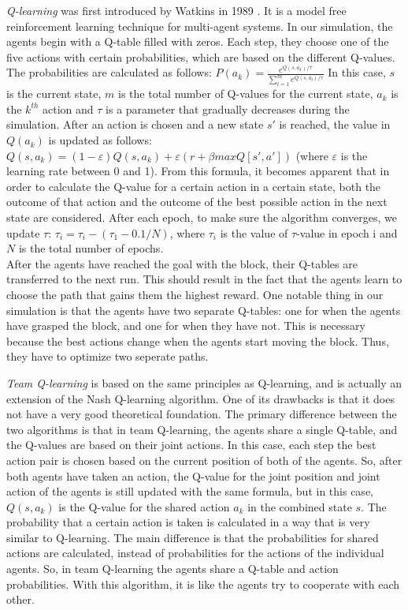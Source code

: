 \textit{Q-learning} was first introduced by Watkins in 1989 \cite{watkins1989}. It is a model free reinforcement learning technique for multi-agent systems. In our simulation, the agents begin with a Q-table filled with zeros. Each step, they choose one of the five actions with certain probabilities, which are based on the different Q-values. The probabilities are calculated as follows: $P(a_{k})=\frac{e^{Q(s,a_{k})/ \tau}}{\sum_{l=1}^{m}e^{Q(s,a_{l})/ \tau}}$ In this case, $s$ is the current state, $m$ is the total number of Q-values for the current state, $a_{k}$ is the $k^{th}$ action and $\tau$ is a parameter that gradually decreases during the simulation. After an action is chosen and a new state $s'$ is reached, the value in $Q(a_{k})$ is updated as follows: $Q(s,a_{k}) = (1- \varepsilon) Q(s,a_{k})+ \varepsilon (r+ \beta maxQ[s',a'])$ (where $\varepsilon$ is the learning rate between 0 and 1). From this formula, it becomes apparent that in order to calculate the Q-value for a certain action in a certain state, both the outcome of that action and the outcome of the best possible action in the next state are considered. After each epoch, to make sure the algorithm converges, we update $\tau$: $\tau_{i} = \tau_{i}-(\tau_{1}-0.1/N)$, where $\tau_{i}$ is the value of $\tau$-value in epoch i and $N$ is the total number of epochs.\\
After the agents have reached the goal with the block, their Q-tables are transferred to the next run. This should result in the fact that the agents learn to choose the path that gains them the highest reward. One notable thing in our simulation is that the agents have two separate Q-tables: one for when the agents have grasped the block, and one for when they have not. This is necessary because the best actions change when the agents start moving the block. Thus, they have to optimize two seperate paths.

\textit{Team Q-learning} is based on the same principles as Q-learning, and is actually an extension of the Nash Q-learning algorithm. One of its drawbacks is that it does not have a very good theoretical foundation. The primary difference between the two algorithms is that in team Q-learning, the agents share a single Q-table, and the Q-values are based on their joint actions. In this case, each step the best action pair is chosen based on the current position of both of the agents. So, after both agents have taken an action, the Q-value for the joint position and joint action of the agents is still updated with the same formula, but in this case,  $Q(s,a_{k})$ is the Q-value for the shared action $a_{k}$ in the combined state $s$. The probability that a certain action is taken is calculated in a way that is very similar to Q-learning. The main difference is that the probabilities for shared actions are calculated, instead of probabilities for the actions of the individual agents. So, in team Q-learning the agents share a Q-table and action probabilities. With this algorithm, it is like the agents try to cooperate with each other.
